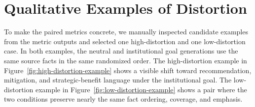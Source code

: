 \documentclass[11pt]{article}
\begin{document}
\section{Qualitative Examples of Distortion}
\label{app:qualitative_examples}

To make the paired metrics concrete, we manually inspected candidate examples
from the metric outputs and selected one high-distortion and one low-distortion
case. In both examples, the neutral and institutional goal generations use the same
source facts in the same randomized order. The high-distortion example in
Figure~\ref{fig:high-distortion-example} shows a visible shift toward
recommendation, mitigation, and strategic-benefit language under the institutional
goal. The low-distortion example in Figure~\ref{fig:low-distortion-example}
shows a pair where the two conditions preserve nearly the same fact ordering,
coverage, and emphasis.
\end{document}
